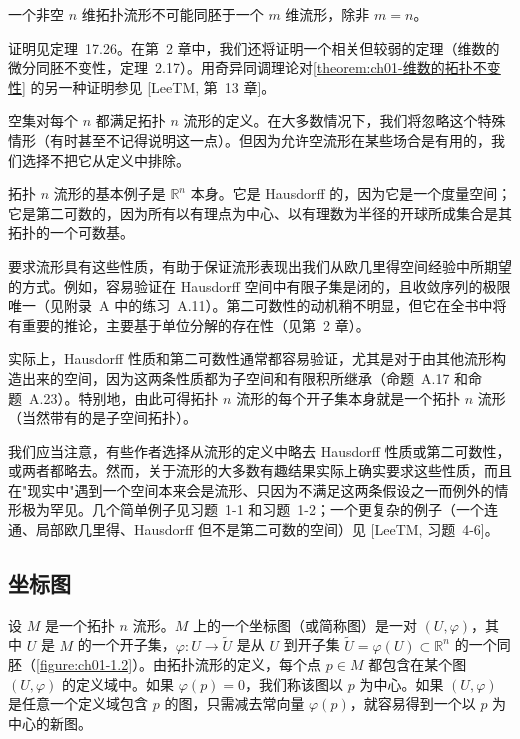 \documentclass[../../main.tex]{subfiles}
\begin{document}
\begin{theorem}[维数的拓扑不变性]\label{theorem:ch01-维数的拓扑不变性}
一个非空 $n$ 维拓扑流形不可能同胚于一个 $m$ 维流形，除非 $m=n$。
\end{theorem}

证明见定理~17.26。在第~2 章中，我们还将证明一个相关但较弱的定理（维数的微分同胚不变性，定理~2.17）。用奇异同调理论对\cref{theorem:ch01-维数的拓扑不变性} 的另一种证明参见 [LeeTM, 第~13 章]。

空集对每个 $n$ 都满足拓扑 $n$ 流形的定义。在大多数情况下，我们将忽略这个特殊情形（有时甚至不记得说明这一点）。但因为允许空流形在某些场合是有用的，我们选择不把它从定义中排除。

拓扑 $n$ 流形的基本例子是 $\mathbb{R}^{n}$ 本身。它是 Hausdorff 的，因为它是一个度量空间；它是第二可数的，因为所有以有理点为中心、以有理数为半径的开球所成集合是其拓扑的一个可数基。

要求流形具有这些性质，有助于保证流形表现出我们从欧几里得空间经验中所期望的方式。例如，容易验证在 Hausdorff 空间中有限子集是闭的，且收敛序列的极限唯一（见附录~A 中的练习~A.11）。第二可数性的动机稍不明显，但它在全书中将有重要的推论，主要基于单位分解的存在性（见第~2 章）。

实际上，Hausdorff 性质和第二可数性通常都容易验证，尤其是对于由其他流形构造出来的空间，因为这两条性质都为子空间和有限积所继承（命题~A.17 和命题~A.23）。特别地，由此可得拓扑 $n$ 流形的每个开子集本身就是一个拓扑 $n$ 流形（当然带有的是子空间拓扑）。

我们应当注意，有些作者选择从流形的定义中略去 Hausdorff 性质或第二可数性，或两者都略去。然而，关于流形的大多数有趣结果实际上确实要求这些性质，而且在"现实中"遇到一个空间本来会是流形、只因为不满足这两条假设之一而例外的情形极为罕见。几个简单例子见习题~1-1 和习题~1-2；一个更复杂的例子（一个连通、局部欧几里得、Hausdorff 但不是第二可数的空间）见 [LeeTM, 习题~4-6]。

\subsection{坐标图}\label{subsection:ch01-坐标图}

设 $M$ 是一个拓扑 $n$ 流形。$M$ 上的一个坐标图（或简称图）是一对 $(U,\varphi)$，其中 $U$ 是 $M$ 的一个开子集，$\varphi:U\to\widetilde{U}$ 是从 $U$ 到开子集 $\widetilde{U}=\varphi(U)\subset\mathbb{R}^{n}$ 的一个同胚（\cref{figure:ch01-1.2}）。由拓扑流形的定义，每个点 $p\in M$ 都包含在某个图 $(U,\varphi)$ 的定义域中。如果 $\varphi(p)=0$，我们称该图以 $p$ 为中心。如果 $(U,\varphi)$ 是任意一个定义域包含 $p$ 的图，只需减去常向量 $\varphi(p)$，就容易得到一个以 $p$ 为中心的新图。
\end{document}
